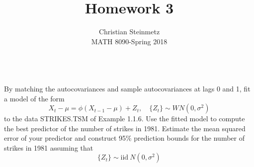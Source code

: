 \documentclass[12pt]{article}
\newenvironment{problem}[2][Problem]{\begin{trivlist}
	\item[\hskip \labelsep {\bfseries #1}\hskip \labelsep {\bfseries #2.}]}{\end{trivlist}}
\begin{document}
	 
	 
	\title{Homework 3}%
	\author{Christian Steinmetz\\ %
	MATH 8090-Spring 2018} %
	 
	\maketitle
	
	\begin{problem}{6}
	$ $ \\
	By matching the autocovariances and sample autocovariances at lags 0 and 1,
	fit a model of the form
	\begin{equation*}
		X_t - \mu = \phi(X_{t-1} - \mu) + Z_t,  \quad \{{Z_t}\} \sim WN(0, \sigma^2)
	\end{equation*}
	to the data STRIKES.TSM of Example 1.1.6. Use the fitted model to compute
	the best predictor of the number of strikes in 1981. Estimate the mean squared
	error of your predictor and construct 95\% prediction bounds for the number of
	strikes in 1981 assuming that
	\begin{equation*}
	\{{Z_t}\} \sim \text{iid} \ N(0, \sigma^2)
	\end{equation*}
	
	\end{problem}
	
\end{document}
